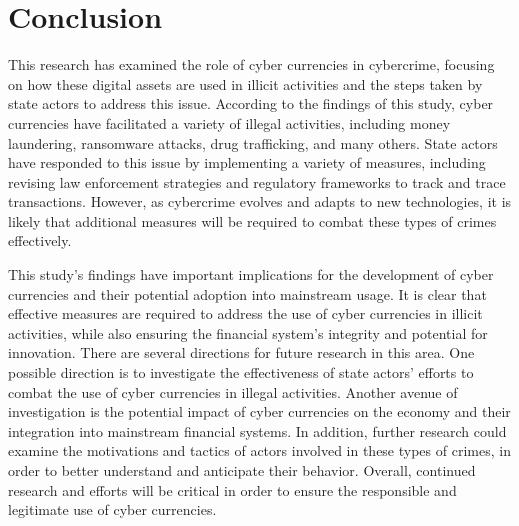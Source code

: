 \chapter{Conclusion}


This research has examined the role of cyber currencies in cybercrime, focusing on how these digital assets are used in illicit activities and the steps taken by state actors to address this issue. According to the findings of this study, cyber currencies have facilitated a variety of illegal activities, including money laundering, ransomware attacks, drug trafficking, and many others. State actors have responded to this issue by implementing a variety of measures, including revising law enforcement strategies and regulatory frameworks to track and trace transactions. However, as cybercrime evolves and adapts to new technologies, it is likely that additional measures will be required to combat these types of crimes effectively.

This study's findings have important implications for the development of cyber currencies and their potential adoption into mainstream usage. It is clear that effective measures are required to address the use of cyber currencies in illicit activities, while also ensuring the financial system's integrity and potential for innovation. 
There are several directions for future research in this area. One possible direction is to investigate the effectiveness of state actors' efforts to combat the use of cyber currencies in illegal activities. Another avenue of investigation is the potential impact of cyber currencies on the economy and their integration into mainstream financial systems. In addition, further research could examine the motivations and tactics of actors involved in these types of crimes, in order to better understand and anticipate their behavior. Overall, continued research and efforts will be critical in order to ensure the responsible and legitimate use of cyber currencies.




